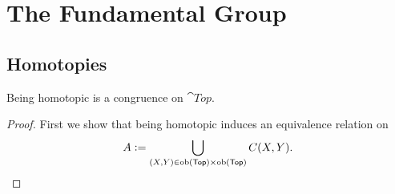 \chapter{The Fundamental Group}
\section{Homotopies}

\begin{proposition}
	Being homotopic is a congruence on $\cat{Top}$.
\end{proposition}

\begin{proof}
	First we show that being homotopic induces an equivalence relation on 
	\begin{equation*}
		A := \bigcup_{(X,Y) \in \operatorname{ob}(\mathsf{Top})\times \operatorname{ob}(\mathsf{Top})} C(X,Y).
	\end{equation*}
\end{proof}
